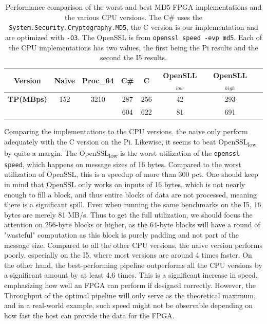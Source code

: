 \documentclass[a4paper, openany]{book}
\begin{document}
\begin{abstact}
\begin{table}[!htb]
\centering
\captionsetup{width=.8\linewidth}
\begin{tabular}{c c c c c c c c}
\hline
\textbf{Version} & Naive & Proc_{64} & C\# & C & OpenSLL$_{low}$ & OpenSLL$_{high}$\\
\hline
\textbf{TP(MBps)} & 152 & 3210 & 287 & 256 & 42 & 293\\
 & & & 604 & 622 & 81 & 691
\end{tabular}
\caption[MD5: FPGA and CPU comparisons]%
{Performance comparison of the worst and best MD5 FPGA implementations and the various CPU versions. The C\# uses the \texttt{System.Security.Cryptography.MD5}, the C version is our implementation and are optimized with \texttt{-O3}. The OpenSSL is from \texttt{openssl speed -evp md5}. Each of the CPU implementations has two values, the first being the Pi results and the second the I5 results.}
\label{tab:MD5compare}
\end{table}
Comparing the implementations to the CPU versions, the naive only perform adequately with the C version on the Pi. Likewise, it seems to beat OpenSSL\textsubscript{low} by quite a margin. The OpenSSL\textsubscript{low} is the worst utilization of the \texttt{openssl speed}, which happens on message sizes of 16 bytes. Compared to the worst utilization of OpenSSL, this is a speedup of more than 300 pct. One should keep in mind that OpenSSL only works on inputs of 16 bytes, which is not nearly enough to fill a block, and thus entire blocks of data are not processed, meaning there is a significant spill. Even when running the same benchmarks on the I5, 16 bytes are merely 81 MB/s. Thus to get the full utilization, we should focus the attention on 256-byte blocks or higher, as the 64-byte blocks will have a round of "wasteful" computation as this block is purely padding and not part of the message size.
Compared to all the other CPU versions, the naive version performs poorly, especially on the I5, where most versions are around 4 times faster. On the other hand, the best-performing pipeline outperforms all the CPU versions by a significant amount by at least 4.6 times. This is a significant increase in speed, emphasizing how well an FPGA can perform if designed correctly. However, the Throughput of the optimal pipeline will only serve as the theoretical maximum, and in a real-world example, such speed might not be observable depending on how fast the host can provide the data for the FPGA.

\end{abstact}
\end{document}
